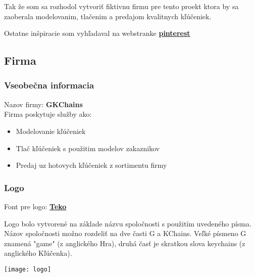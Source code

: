       Tak že som sa rozhodol vytvoriť fiktivnu firmu pre tento proekt ktora by sa zaoberala modelovanim, tlačenim a predajom kvalitnych kľúčeniek.

      Ostatne inšpiracie som vyhľadaval na webstranke \textbf{\href{https://pinterest.com}{pinterest}}

    \subsection{Firma}
      \subsubsection{Vseobečna informacia}
      Nazov firmy: \textbf{GKChains} \\
      Firma poskytuje služby ako:
      \begin{itemize}
        \item{Modelovanie kľúčeniek}
        \item{Tlač kľúčeniek s použitim modelov zakaznikov}
        \item{Predaj uz hotovych kľúčeniek z sortimentu firmy}
      \end{itemize}
      \subsubsection{Logo}
      Font pre logo: \textbf{\href{https://fonts.google.com/specimen/Teko?query=Teko}{Teko}}

      Logo bolo vytvorené na základe názvu spoločnosti s použitím uvedeného písma. Názov spoločnosti možno rozdeliť na dve časti G a KChains. Veľké písmeno G znamená "game" (z anglického Hra), druhá časť je skratkou slova keychains (z anglického Kľúčenka).

      \begin{center}
        \texttt{[image: logo]}
      \end{center}

